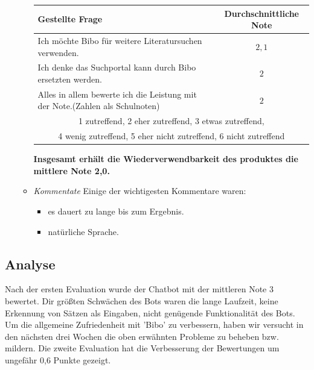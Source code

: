 \documentclass[12pt,a4paper]{scrartcl}
\begin{document}
\begin{enumerate}
\begin{itemize}
\begin{center}
\begin{tabularx}{\linewidth}{|X|c|}
\hline
Gestellte Frage & Durchschnittliche Note  \\ \hline
Ich möchte Bibo für weitere Literatursuchen verwenden. & $2,1$ \\ \hline


Ich denke das Suchportal kann durch Bibo ersetzten werden. & $2$ \\ \hline

Alles in allem bewerte ich die Leistung mit der Note.(Zahlen als Schulnoten) & $2$ \\ \hline
\multicolumn{2}{|c|}{1 zutreffend, 2 eher zutreffend, 3 etwas zutreffend,}\\
\multicolumn{2}{|c|}{4 wenig zutreffend, 5 eher nicht zutreffend, 6 nicht zutreffend} \\ \hline
\end{tabularx}
\end{center}
\textbf{Insgesamt erhält die Wiederverwendbarkeit des produktes die mittlere Note 2,0.}
\item \textit{Kommentate}
Einige der wichtigesten Kommentare waren:
\begin{itemize}
\item es dauert zu lange bis zum Ergebnis.
\item natürliche Sprache.
\end{itemize}
\end{itemize}
\end{enumerate}

\subsection{Analyse}
Nach der ersten Evaluation wurde der Chatbot mit der mittleren Note 3 bewertet. Dir größten Schwächen des Bots waren die lange Laufzeit, keine Erkennung von Sätzen als Eingaben, nicht genügende Funktionalität des Bots.\newline
Um die allgemeine Zufriedenheit mit 'Bibo' zu verbessern, haben wir versucht in den nächsten drei Wochen  die oben erwähnten Probleme zu beheben bzw. mildern.\newline
Die zweite Evaluation hat die Verbesserung der Bewertungen um ungefähr 0,6 Punkte gezeigt. 
\end{document}
